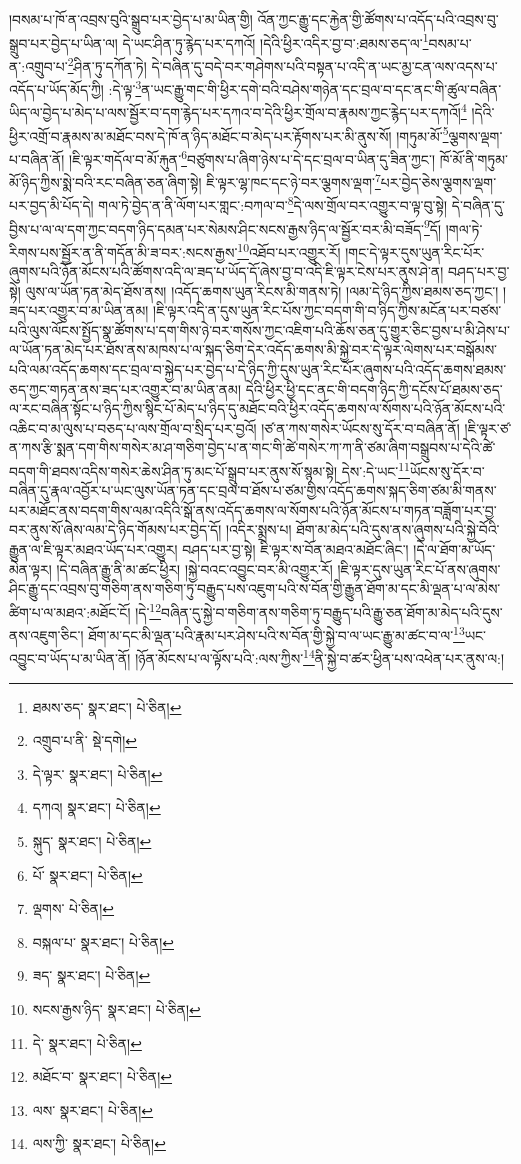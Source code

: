 །བསམ་པ་ཁོ་ན་འབྲས་བུའི་སྒྲུབ་པར་བྱེད་པ་མ་ཡིན་གྱི། འོན་ཀྱང་རྒྱུ་དང་རྐྱེན་གྱི་ཚོགས་པ་འདོད་པའི་འབྲས་བུ་སྒྲུབ་པར་བྱེད་པ་ཡིན་ལ། དེ་ཡང་ཤིན་ཏུ་རྙེད་པར་དཀའོ། །དེའི་ཕྱིར་འདིར་བྱ་བ་:ཐམས་ཅད་ལ་\footnote{ཐམས་ཅད་  སྣར་ཐང་།  པེ་ཅིན། }བསམ་པ་ན་:འགྲུབ་པ་\footnote{འགྲུབ་པ་ནི་  སྡེ་དགེ། }ཤིན་ཏུ་དཀོན་ཏེ། དེ་བཞིན་དུ་བདེ་བར་གཤེགས་པའི་བསྟན་པ་འདི་ན་ཡང་མྱ་ངན་ལས་འདས་པ་འདོད་པ་ཡོད་མོད་ཀྱི། :དེ་ལྟ་\footnote{དེ་ལྟར་  སྣར་ཐང་།  པེ་ཅིན། }ན་ཡང་རྒྱུ་གང་གི་ཕྱིར་དགེ་བའི་བཤེས་གཉེན་དང་བྲལ་བ་དང་ནང་གི་ཚུལ་བཞིན་ཡིད་ལ་བྱེད་པ་མེད་པ་ལས་སྦྱོར་བ་དག་རྙེད་པར་དཀའ་བ་དེའི་ཕྱིར་གྲོལ་བ་རྣམས་ཀྱང་རྙེད་པར་དཀའོ།\footnote{དཀའ།  སྣར་ཐང་།  པེ་ཅིན། } །དེའི་ཕྱིར་འགྲོ་བ་རྣམས་མ་མཐོང་བས་དེ་ཁོ་ན་ཉིད་མཐོང་བ་མེད་པར་རྟོགས་པར་མི་ནུས་སོ། །གཏུམ་མོ་\footnote{སྐུད་  སྣར་ཐང་།  པེ་ཅིན། }ལྕགས་ལྡག་པ་བཞིན་ནོ། །ཇི་ལྟར་གདོལ་བ་མོ་རྐུན་\footnote{པོ་  སྣར་ཐང་།  པེ་ཅིན། }བཙུགས་པ་ཞིག་ཉེས་པ་དེ་དང་བྲལ་བ་ཡིན་དུ་ཟིན་ཀྱང་། ཁོ་མོ་ནི་གཏུམ་མོ་ཉིད་ཀྱིས་སྨེ་བའི་རང་བཞིན་ཅན་ཞིག་སྟེ། ཇི་ལྟར་ལྷ་ཁང་དང་ཉེ་བར་ལྕགས་ལྡག་\footnote{ལྡགས་  པེ་ཅིན། }པར་བྱེད་ཅེས་ལྕགས་ལྡག་པར་བྱད་མི་པོད་དེ། གལ་ཏེ་བྱེད་ན་ནི་ལོག་པར་གླང་:བཀལ་བ་\footnote{བསྐལ་པ་  སྣར་ཐང་།  པེ་ཅིན། }དེ་ལས་གྲོལ་བར་འགྱུར་བ་ལྟ་བུ་སྟེ། དེ་བཞིན་དུ་བྱིས་པ་ལ་ལ་དག་ཀྱང་བདག་ཉིད་དམན་པར་སེམས་ཤིང་སངས་རྒྱས་ཉིད་ལ་སྦྱོར་བར་མི་བཟོད་\footnote{ཟད་  སྣར་ཐང་།  པེ་ཅིན། }དོ། །གལ་ཏེ་རིགས་པས་སྦྱོར་ན་ནི་གདོན་མི་ཟ་བར་:སངས་རྒྱས་\footnote{སངས་རྒྱས་ཉིད་  སྣར་ཐང་།  པེ་ཅིན། }འཐོབ་པར་འགྱུར་རོ། །གང་དེ་ལྟར་དུས་ཡུན་རིང་པོར་ཞུགས་པའི་ཉོན་མོངས་པའི་ཚོགས་འདི་ལ་ཟད་པ་ཡོད་དོ་ཞེས་བྱ་བ་འདི་ཇི་ལྟར་ངེས་པར་ནུས་ཤེ་ན། བཤད་པར་བྱ་སྟེ། ལུས་ལ་ཡོན་ཏན་མེད་ཐོས་ནས། །འདོད་ཆགས་ཡུན་རིངས་མི་གནས་ཏེ། །ལམ་དེ་ཉིད་ཀྱིས་ཐམས་ཅད་ཀྱང་། །ཟད་པར་འགྱུར་བ་མ་ཡིན་ནམ། །ཇི་ལྟར་འདི་ན་དུས་ཡུན་རིང་པོས་ཀྱང་བདག་གི་བ་ཉིད་ཀྱིས་མངོན་པར་བཙས་པའི་ལུས་ལོངས་སྤྱོད་སྣ་ཚོགས་པ་དག་གིས་ཉེ་བར་གསོས་ཀྱང་འཇིག་པའི་ཆོས་ཅན་དུ་གྱུར་ཅིང་བྱས་པ་མི་ཤེས་པ་ལ་ཡོན་ཏན་མེད་པར་ཐོས་ནས་མཁས་པ་ལ་སྐད་ཅིག་དེར་འདོད་ཆགས་མི་སྐྱེ་བར་དེ་ལྟར་ལེགས་པར་བསྒོམས་པའི་ལམ་འདོད་ཆགས་དང་བྲལ་བ་སྐྱེད་པར་བྱེད་པ་དེ་ཉིད་ཀྱི་དུས་ཡུན་རིང་པོར་ཞུགས་པའི་འདོད་ཆགས་ཐམས་ཅད་ཀྱང་གཏན་ནས་ཟད་པར་འགྱུར་བ་མ་ཡིན་ནམ། དེའི་ཕྱིར་ཕྱི་དང་ནང་གི་བདག་ཉིད་ཀྱི་དངོས་པོ་ཐམས་ཅད་ལ་རང་བཞིན་སྟོང་པ་ཉིད་ཀྱིས་སྙིང་པོ་མེད་པ་ཉིད་དུ་མཐོང་བའི་ཕྱིར་འདོད་ཆགས་ལ་སོགས་པའི་ཉོན་མོངས་པའི་འཆིང་བ་མ་ལུས་པ་བཅད་པ་ལས་གྲོལ་བ་སྲིད་པར་བྱའོ། །ཙ་ན་ཀས་གསེར་ཡོངས་སུ་དོར་བ་བཞིན་ནོ། །ཇི་ལྟར་ཙ་ན་ཀས་རྩི་སྨན་དག་གིས་གསེར་མ་ཤ་གཅིག་བྱེད་པ་ན་གང་གི་ཚེ་གསེར་ཀ་ཀ་ནི་ཙམ་ཞིག་བསྒྲུབས་པ་དེའི་ཚེ་བདག་གི་ཐབས་འདིས་གསེར་ཆེས་ཤིན་ཏུ་མང་པོ་སྒྲུབ་པར་ནུས་སོ་སྙམ་སྟེ། དེས་:དེ་ཡང་\footnote{དེ་  སྣར་ཐང་།  པེ་ཅིན། }ཡོངས་སུ་དོར་བ་བཞིན་དུ་རྣལ་འབྱོར་པ་ཡང་ལུས་ཡོན་ཏན་དང་བྲལ་བ་ཐོས་པ་ཙམ་གྱིས་འདོད་ཆགས་སྐད་ཅིག་ཙམ་མི་གནས་པར་མཐོང་ནས་བདག་གིས་ལམ་འདིའི་སྒོ་ནས་འདོད་ཆགས་ལ་སོགས་པའི་ཉོན་མོངས་པ་གཏན་བཟློག་པར་བྱ་བར་ནུས་སོ་ཞེས་ལམ་དེ་ཉིད་གོམས་པར་བྱེད་དོ། །འདིར་སྨྲས་པ། ཐོག་མ་མེད་པའི་དུས་ནས་ཞུགས་པའི་སྐྱེ་བོའི་རྒྱུན་ལ་ཇི་ལྟར་མཐའ་ཡོད་པར་འགྱུར། བཤད་པར་བྱ་སྟེ། ཇི་ལྟར་ས་བོན་མཐའ་མཐོང་ཞིང་། །དེ་ལ་ཐོག་མ་ཡོད་མེན་ལྟར། །དེ་བཞིན་རྒྱུ་ནི་མ་ཚང་ཕྱིར། །སྐྱེ་བའང་འབྱུང་བར་མི་འགྱུར་རོ། །ཇི་ལྟར་དུས་ཡུན་རིང་པོ་ནས་ཞུགས་ཤིང་རྒྱུ་དང་འབྲས་བུ་གཅིག་ནས་གཅིག་ཏུ་བརྒྱུད་པས་འཇུག་པའི་ས་བོན་གྱི་རྒྱུན་ཐོག་མ་དང་མི་ལྡན་པ་ལ་མེས་ཚིག་པ་ལ་མཐའ་:མཐོང་ངོ། །དེ་\footnote{མཐོང་བ་  སྣར་ཐང་།  པེ་ཅིན། }བཞིན་དུ་སྐྱེ་བ་གཅིག་ནས་གཅིག་ཏུ་བརྒྱུད་པའི་རྒྱུ་ཅན་ཐོག་མ་མེད་པའི་དུས་ནས་འཇུག་ཅིང་། ཐོག་མ་དང་མི་ལྡན་པའི་རྣམ་པར་ཤེས་པའི་ས་བོན་གྱི་སྐྱེ་བ་ལ་ཡང་རྒྱུ་མ་ཚང་བ་ལ་\footnote{ལས་  སྣར་ཐང་།  པེ་ཅིན། }ཡང་འབྱུང་བ་ཡོད་པ་མ་ཡིན་ནོ། །ཉོན་མོངས་པ་ལ་ལྟོས་པའི་:ལས་ཀྱིས་\footnote{ལས་ཀྱི་  སྣར་ཐང་།  པེ་ཅིན། }ནི་སྐྱེ་བ་ཚར་ཕྱིན་པས་འཕེན་པར་ནུས་ལ:། 
